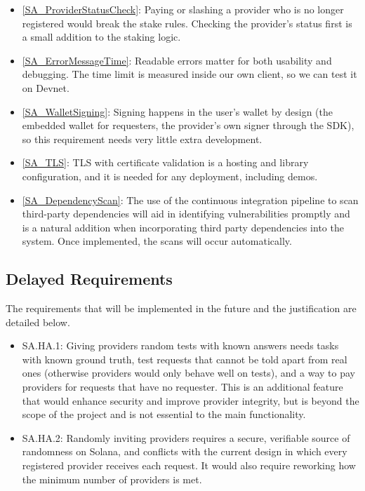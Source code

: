 \documentclass{article}
\newcommand{\saref}[1]{\ref{#1}}
\newcommand{\hazardGroundTruthRef}{SA.HA.1}
\newcommand{\hazardRandomInvitationsRef}{SA.HA.2}
\begin{document}
\begin{itemize}
\item \saref{SA_ProviderStatusCheck}: Paying or slashing a provider who is no longer registered would break the stake rules. Checking the provider's status first is a small addition to the staking logic.

\item \saref{SA_ErrorMessageTime}: Readable errors matter for both usability and debugging. The time limit is measured inside our own client, so we can test it on Devnet.

\item \saref{SA_WalletSigning}: Signing happens in the user's wallet by design (the embedded wallet for requesters, the provider's own signer through the SDK), so this requirement needs very little extra development.

\item \saref{SA_TLS}: TLS with certificate validation is a hosting and library configuration, and it is needed for any deployment, including demos.

\item \saref{SA_DependencyScan}: The use of the continuous integration pipeline to scan third-party dependencies will aid in identifying vulnerabilities promptly and is a natural addition when incorporating third party dependencies into the system. Once implemented, the scans will occur automatically.

\end{itemize}

\subsection{Delayed Requirements}

The requirements that will be implemented in the future and the justification are detailed below.

\begin{itemize}

\item \hazardGroundTruthRef: Giving providers random tests with known answers needs tasks with known ground truth, test requests that cannot be told apart from real ones (otherwise providers would only behave well on tests), and a way to pay providers for requests that have no requester. This is an additional feature that would enhance security and improve provider integrity, but is beyond the scope of the project and is not essential to the main functionality.

\item \hazardRandomInvitationsRef: Randomly inviting providers requires a secure, verifiable source of randomness on Solana, and conflicts with the current design in which every registered provider receives each request. It would also require reworking how the minimum number of providers is met.

\end{itemize}
\end{document}
